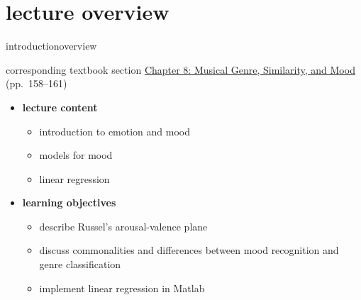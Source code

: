 




\subtitle{Module 8.3: Mood Recognition}


	

    \section[overview]{lecture overview}
        \begin{frame}{introduction}{overview}
            \begin{block}{corresponding textbook section}
                    \href{http://ieeexplore.ieee.org/xpl/articleDetails.jsp?arnumber=6331125}{Chapter 8: Musical Genre, Similarity, and Mood} (pp.~158--161)
            \end{block}

            \begin{itemize}
                \item   \textbf{lecture content}
                    \begin{itemize}
                        \item   introduction to emotion and mood
                        \item   models for mood
                        \item   linear regression
                    \end{itemize}
                \bigskip
                \item<2->   \textbf{learning objectives}
                    \begin{itemize}
                        \item   describe Russel's arousal-valence plane
                        \item   discuss commonalities and differences between mood recognition and genre classification
                        \item   implement linear regression in Matlab
                    \end{itemize}
            \end{itemize}
        \end{frame}

